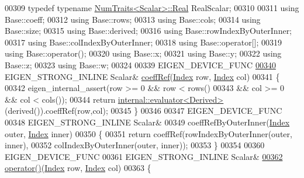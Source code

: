 \begin{DoxyCode}
00309     \textcolor{keyword}{typedef} \textcolor{keyword}{typename} \hyperlink{group___core___module_struct_eigen_1_1_num_traits}{NumTraits<Scalar>::Real} RealScalar;
00310 
00311     \textcolor{keyword}{using} Base::coeff;
00312     \textcolor{keyword}{using} Base::rows;
00313     \textcolor{keyword}{using} Base::cols;
00314     \textcolor{keyword}{using} Base::size;
00315     \textcolor{keyword}{using} Base::derived;
00316     \textcolor{keyword}{using} Base::rowIndexByOuterInner;
00317     \textcolor{keyword}{using} Base::colIndexByOuterInner;
00318     \textcolor{keyword}{using} Base::operator[];
00319     \textcolor{keyword}{using} Base::operator();
00320     \textcolor{keyword}{using} Base::x;
00321     \textcolor{keyword}{using} Base::y;
00322     \textcolor{keyword}{using} Base::z;
00323     \textcolor{keyword}{using} Base::w;
00324 
00339     EIGEN\_DEVICE\_FUNC
\hyperlink{group___core___module_adf14e9563a1d2a39a6fee334dfcfb105}{00340}     EIGEN\_STRONG\_INLINE Scalar& \hyperlink{group___core___module_adf14e9563a1d2a39a6fee334dfcfb105}{coeffRef}(\hyperlink{group___core___module_a554f30542cc2316add4b1ea0a492ff02}{Index} row, \hyperlink{group___core___module_a554f30542cc2316add4b1ea0a492ff02}{Index} col)
00341     \{
00342       eigen\_internal\_assert(row >= 0 && row < rows()
00343                          && col >= 0 && col < cols());
00344       \textcolor{keywordflow}{return} \hyperlink{struct_eigen_1_1internal_1_1evaluator}{internal::evaluator<Derived>}(derived()).coeffRef(row,col);
00345     \}
00346 
00347     EIGEN\_DEVICE\_FUNC
00348     EIGEN\_STRONG\_INLINE Scalar&
00349     coeffRefByOuterInner(\hyperlink{group___core___module_a554f30542cc2316add4b1ea0a492ff02}{Index} outer, \hyperlink{group___core___module_a554f30542cc2316add4b1ea0a492ff02}{Index} inner)
00350     \{
00351       \textcolor{keywordflow}{return} coeffRef(rowIndexByOuterInner(outer, inner),
00352                       colIndexByOuterInner(outer, inner));
00353     \}
00354 
00360     EIGEN\_DEVICE\_FUNC
00361     EIGEN\_STRONG\_INLINE Scalar&
\hyperlink{group___core___module_ab0c40ee1944059a3e32a125cf794d547}{00362}     \hyperlink{group___core___module_ab0c40ee1944059a3e32a125cf794d547}{operator()}(\hyperlink{group___core___module_a554f30542cc2316add4b1ea0a492ff02}{Index} row, \hyperlink{group___core___module_a554f30542cc2316add4b1ea0a492ff02}{Index} col)
00363     \{

\end{DoxyCode}
